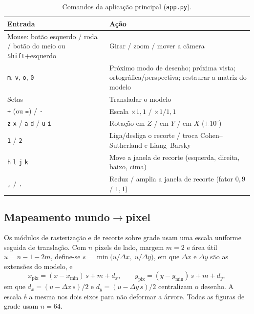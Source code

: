 \documentclass[11pt, a4paper]{article}
\begin{document}
\begin{table}[htbp]
  \centering
  \small
  \caption{Comandos da aplicação principal (\texttt{app.py}).}
  \label{tab:comandos}
  \begin{tabularx}{\textwidth}{l X}
    \toprule
    \textbf{Entrada} & \textbf{Ação} \\
    \midrule
    Mouse: botão esquerdo / roda / botão do meio ou \texttt{Shift}+esquerdo & Girar / zoom / mover a câmera \\
    \texttt{m}, \texttt{v}, \texttt{o}, \texttt{0} & Próximo modo de desenho; próxima vista; ortográfica/perspectiva; restaurar a matriz do modelo \\
    Setas & Transladar o modelo \\
    \texttt{+} (ou \texttt{=}) / \texttt{-} & Escala $\times1{,}1$ / $\times1/1{,}1$ \\
    \texttt{z} \texttt{x} / \texttt{a} \texttt{d} / \texttt{u} \texttt{i} & Rotação em $Z$ / em $Y$ / em $X$ ($\pm10^{\circ}$) \\
    \texttt{1} / \texttt{2} & Liga/desliga o recorte / troca Cohen--Sutherland e Liang--Barsky \\
    \texttt{h} \texttt{l} \texttt{j} \texttt{k} & Move a janela de recorte (esquerda, direita, baixo, cima) \\
    \texttt{,} / \texttt{.} & Reduz / amplia a janela de recorte (fator $0{,}9$ / $1{,}1$) \\
    \bottomrule
  \end{tabularx}
\end{table}

\subsection{Mapeamento mundo$\to$pixel}
Os módulos de rasterização e de recorte sobre grade usam uma escala uniforme seguida de translação. Com $n$ pixels de lado, margem $m=2$ e área útil $u=n-1-2m$, define-se $s=\min\!\big(u/\Delta x,\;u/\Delta y\big)$, em que $\Delta x$ e $\Delta y$ são as extensões do modelo, e
\begin{equation}
  x_{\text{pix}}=(x-x_{\min})\,s+m+d_x,\qquad y_{\text{pix}}=(y-y_{\min})\,s+m+d_y,
  \label{eq:mapeamento}
\end{equation}
em que $d_x=(u-\Delta x\,s)/2$ e $d_y=(u-\Delta y\,s)/2$ centralizam o desenho. A escala é a mesma nos dois eixos para não deformar a árvore. Todas as figuras de grade usam $n=64$.
\end{document}
